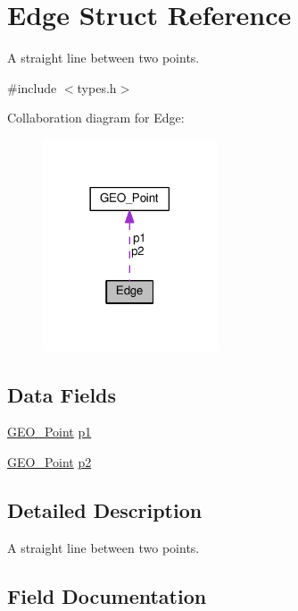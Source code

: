 \hypertarget{struct_edge}{}\section{Edge Struct Reference}
\label{struct_edge}


A straight line between two points.  




{\ttfamily \#include $<$types.\+h$>$}



Collaboration diagram for Edge\+:
\nopagebreak
\begin{figure}[H]
\begin{center}
\leavevmode
\includegraphics[width=146pt]{struct_edge__coll__graph}
\end{center}
\end{figure}
\subsection*{Data Fields}
\begin{DoxyCompactItemize}
\item 
\hyperlink{struct_g_e_o___point}{G\+E\+O\+\_\+\+Point} \hyperlink{struct_edge_aece77b6cba572ad1536ef0f6ce20cb82}{p1}
\item 
\hyperlink{struct_g_e_o___point}{G\+E\+O\+\_\+\+Point} \hyperlink{struct_edge_a51a95439187066c7cc5f32a60cdef5a6}{p2}
\end{DoxyCompactItemize}


\subsection{Detailed Description}
A straight line between two points. 

\subsection{Field Documentation}
